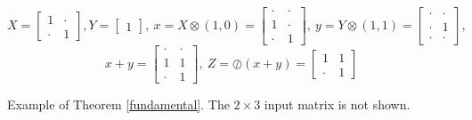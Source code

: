 \small
$$
X =
\begin{bmatrix}
1 & \cdot \\[-.2em]
\cdot & 1
\end{bmatrix}\!\!,
Y =
\begin{bmatrix}
1
\end{bmatrix}\!\!, \
x = X\otimes (1,0) =
\begin{bmatrix}
\cdot & \cdot \\[-.2em]
1 & \cdot \\[-.2em]
\cdot & 1
\end{bmatrix}\!\!, \
y = Y\otimes (1,1) =
\begin{bmatrix}
\cdot & \cdot \\[-.2em]
\cdot & 1 \\[-.2em]
\cdot & \cdot
\end{bmatrix}\!\!,
$$
$$
x + y =
\begin{bmatrix}
\cdot & \cdot \\[-.2em]
1 & 1 \\[-.2em]
\cdot & 1
\end{bmatrix}\!\!, \
Z = \oslash(x+y)=
\begin{bmatrix}
1 & 1 \\[-.2em]
\cdot & 1
\end{bmatrix}\!\!
$$
\caption{Example of Theorem \ref{fundamental}. The $2\times 3$ input matrix is not shown.}
